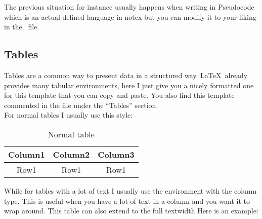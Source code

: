 \documentclass[../main.tex]{subfiles}
\begin{document}
The previous situation for instance usually happens when writing in Pseudocode which is an actual defined language in notex but you can modify it to your liking in the ~file.\\


\pagebreak
\subsection{Tables}

Tables are a common way to present data in a structured way. \LaTeX\ already
provides many tabular environments, here I just give you a nicely formatted one
for this template that you can copy and paste. You also find this template
commented in the  file under the ``Tables'' section.\\
For normal tables I usually use this style:

\begin{table}[htb]
  \renewcommand{\arraystretch}{1.5} %
  \centering
  \begin{tabular}{|c|c|c|}

    \hline
    \rowcolor{boxcolor}
    \textbf{Column1} &
    \textbf{Column2} &
    \textbf{Column3} \\ 

    \hline
    Row1 & 
    Row1 & 
    Row1 \\
    \hline

  \end{tabular}
  \caption{Normal table}
  \label{tab:mytablelabel}
  \renewcommand{\arraystretch}{1} %
\end{table}

While for tables with a lot of text I usually use the  environment
with the  column type. This is useful when you have a lot of text in a
column and you want it to wrap around. This table can also extend to the full textwidth Here is an example:
\end{document}

